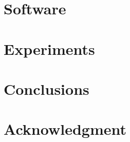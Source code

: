 \documentclass[conference]{IEEEtran}
\begin{document}
\section{Software}
\label{sec:software}


\section{Experiments}
\label{sec:experiments}


\section{Conclusions}
\label{sec:conclusions}


\section*{Acknowledgment}




\end{document}
